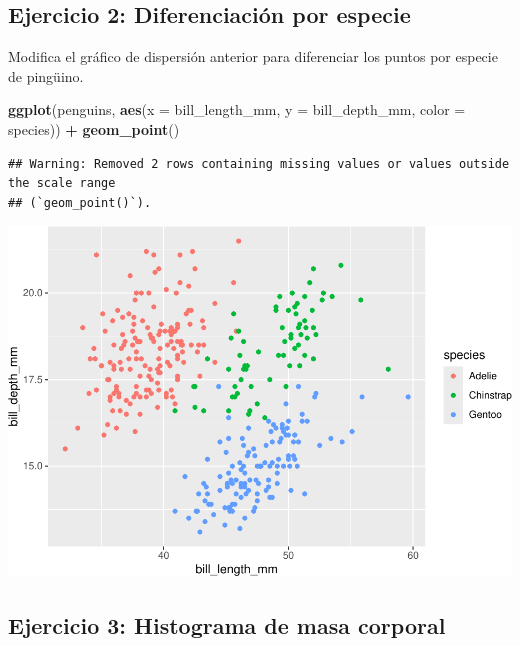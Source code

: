 \documentclass[
]{book}
\newenvironment{Shaded}{\begin{snugshade}}{\end{snugshade}}
\newcommand{\AttributeTok}[1]{\textcolor[rgb]{0.13,0.29,0.53}{#1}}
\newcommand{\FunctionTok}[1]{\textcolor[rgb]{0.13,0.29,0.53}{\textbf{#1}}}
\newcommand{\NormalTok}[1]{#1}
\newcommand{\SpecialCharTok}[1]{\textcolor[rgb]{0.81,0.36,0.00}{\textbf{#1}}}
\begin{document}
\hypertarget{ejercicio-2-diferenciaciuxf3n-por-especie}{%
\subsection{Ejercicio 2: Diferenciación por especie}\label{ejercicio-2-diferenciaciuxf3n-por-especie}}

Modifica el gráfico de dispersión anterior para diferenciar los puntos por especie de pingüino.

\begin{Shaded}
\begin{Highlighting}[]
\FunctionTok{ggplot}\NormalTok{(penguins, }\FunctionTok{aes}\NormalTok{(}\AttributeTok{x =}\NormalTok{ bill\_length\_mm, }\AttributeTok{y =}\NormalTok{ bill\_depth\_mm, }\AttributeTok{color =}\NormalTok{ species)) }\SpecialCharTok{+}
  \FunctionTok{geom\_point}\NormalTok{()}
\end{Highlighting}
\end{Shaded}

\begin{verbatim}
## Warning: Removed 2 rows containing missing values or values outside the scale range
## (`geom_point()`).
\end{verbatim}

\includegraphics{bookdown-demo_files/figure-latex/unnamed-chunk-178-1.pdf}

\hypertarget{ejercicio-3-histograma-de-masa-corporal}{%
\subsection{Ejercicio 3: Histograma de masa corporal}\label{ejercicio-3-histograma-de-masa-corporal}}
\end{document}
